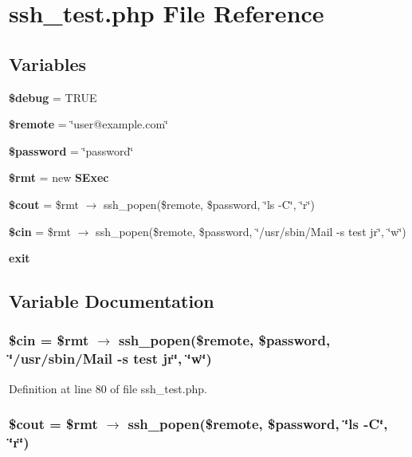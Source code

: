 \section{ssh\_\-test.php File Reference}
\label{ssh__test_8php}
\subsection*{Variables}
\begin{CompactItemize}
\item 
{\bf \$debug} = TRUE
\item 
{\bf \$remote} = \char`\"{}user@example.com\char`\"{}
\item 
{\bf \$password} = \char`\"{}password\char`\"{}
\item 
{\bf \$rmt} = new {\bf SExec}
\item 
{\bf \$cout} = \$rmt $\rightarrow$ ssh\_\-popen(\$remote, \$password, \char`\"{}ls -C\char`\"{}, \char`\"{}r\char`\"{})
\item 
{\bf \$cin} = \$rmt $\rightarrow$ ssh\_\-popen(\$remote, \$password, \char`\"{}/usr/sbin/Mail -s test jr\char`\"{}, \char`\"{}w\char`\"{})
\item 
{\bf exit}
\end{CompactItemize}


\subsection{Variable Documentation}
\subsubsection{\setlength{\rightskip}{0pt plus 5cm}\$cin = \$rmt $\rightarrow$ ssh\_\-popen(\$remote, \$password, \char`\"{}/usr/sbin/Mail -s test jr\char`\"{}, \char`\"{}w\char`\"{})}\label{ssh__test_8php_a5}




Definition at line 80 of file ssh\_\-test.php.
\subsubsection{\setlength{\rightskip}{0pt plus 5cm}\$cout = \$rmt $\rightarrow$ ssh\_\-popen(\$remote, \$password, \char`\"{}ls -C\char`\"{}, \char`\"{}r\char`\"{})}\label{ssh__test_8php_a4}




